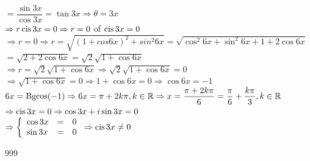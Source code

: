 \documentclass[a4paper]{article}
\begin{document}
$= \dfrac{\sin 3x}{\cos 3x} = \tan 3x \Rightarrow \theta = 3x$\\

$\Rightarrow r \operatorname{cis} 3x = 0 \Rightarrow r = 0$ of $\operatorname{cis} 3x = 0$\\

$\Rightarrow r = 0 \Rightarrow r = \sqrt{(1 + cos 6x)^2 + sin^2 6x} = \sqrt{\cos^2 6x + \sin^2 6x + 1 + 2 \cos 6x}$\\

$= \sqrt{2 + 2 \cos 6x} = \sqrt{2} \sqrt{1 + \cos 6x}$\\

$\Rightarrow r = \sqrt{2} \sqrt{1 + \cos 6x} \Rightarrow \sqrt{2} \sqrt{1 + \cos 6x} = 0$\\

$\Rightarrow \sqrt{1 + \cos 6x} = 0 \Rightarrow 1 + \cos 6x = 0 \Rightarrow \cos 6x = -1$\\

$6x = \operatorname{Bgcos}(-1) \Rightarrow 6x = \pi + 2k\pi, k\in\mathbb{R} \Rightarrow x = \dfrac{\pi + 2k\pi}{6} = \dfrac{\pi}{6} + \dfrac{k\pi}{3}, k\in\mathbb{R}$\\

$\Rightarrow \operatorname{cis} 3x = 0 \Rightarrow \cos 3x + i \sin 3x = 0$\\

$\Rightarrow \left\{
	\begin{array}{lcr}
		\cos 3x & = & 0	\\
		\sin 3x & = & 0
	\end{array}
\right. \Rightarrow \operatorname{cis} 3x \ne 0$\\

\begin{thebibliography}{999}
\end{thebibliography}
\end{document}
